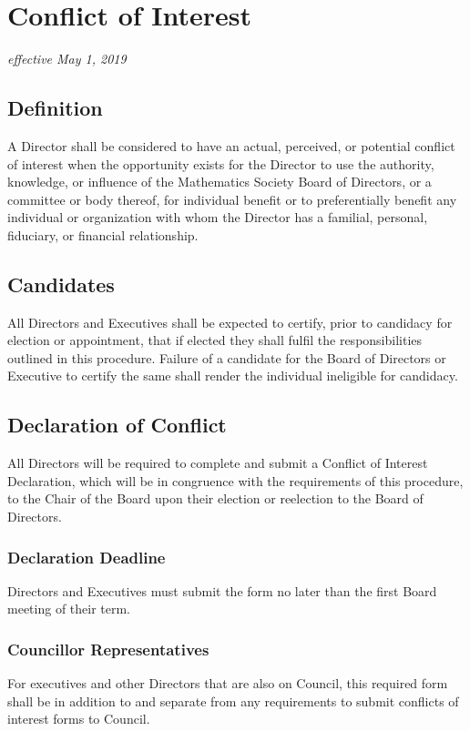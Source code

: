 \section{Conflict of Interest}
\emph{effective May 1, 2019}\\

\subsection{Definition}
A Director shall be considered to have an actual, perceived, or potential conflict of interest when the opportunity exists for the Director to use the authority, knowledge, or influence of the Mathematics Society Board of Directors, or a committee or body thereof, for individual benefit or to preferentially benefit any individual or organization with whom the Director has a familial, personal, fiduciary, or financial relationship.

\subsection{Candidates}
All Directors and Executives shall be expected to certify, prior to candidacy for election or appointment, that if elected they shall fulfil the responsibilities outlined in this procedure. Failure of a candidate for the Board of Directors or Executive to certify the same shall render the individual ineligible for candidacy.

\subsection{Declaration of Conflict}
All Directors will be required to complete and submit a Conflict of Interest Declaration, which will be in congruence with the requirements of this procedure, to the Chair of the Board upon their election or reelection to the Board of Directors. 

\subsubsection{Declaration Deadline}
Directors and Executives must submit the form no later than the first Board meeting of their term.

\subsubsection{Councillor Representatives}
For executives and other Directors that are also on Council, this required form shall be in addition to and separate from any requirements to submit conflicts of interest forms to Council.

